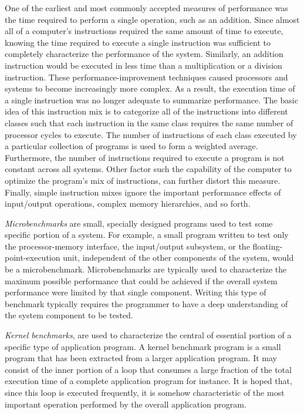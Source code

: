 \documentclass[openany, a4paper]{book}
\theoremstyle{break}
\theoremstyle{example}
\theoremstyle{note}
\theoremstyle{break}
\theoremstyle{exercise}
\begin{document}
One of the earliest and most commonly accepted measures of performance was
the time required to perform a single operation, such as an addition. Since
almost all of a computer's instructions required the same amount of time to
execute, knowing the time required to execute a single instruction was
sufficient to completely characterize the performance of the
system. Similarly, an addition instruction would be executed in less time
than a multiplication or a division instruction. These
performance-improvement techniques caused processors and systems to become
increasingly more complex. As a result, the execution time of a single
instruction was no longer adequate to summarize performance. The basic idea
of this instruction mix is to categorize all of the instructions into
different classes such that each instruction in the same class requires the
same number of processor cycles to execute. The number of instructions of
each class executed by a particular collection of programs is used to form a
weighted average. Furthermore, the number of instructions required to
execute a program is not constant across all systems. Other factor such the
capability of the computer to optimize the program's mix of instructions,
can further distort this measure. Finally, simple instruction mixes ignore
the important performance effects of input/output operations, complex memory
hierarchies, and so forth.

\emph{Microbenchmarks} are small, specially designed programs used to test some
specific portion of a system. For example, a small program written to test
only the processor-memory interface, the input/output subsystem, or the
floating-point-execution unit, independent of the other components of the
system, would be a microbenchmark. Microbenchmarks are typically used to
characterize the maximum possible performance that could be achieved if the
overall system performance were limited by that single component.
Writing this type of benchmark typically requires the programmer to have a
deep understanding of the system component to be tested.

\emph{Kernel benchmarks}, are used to characterize the central of essential portion
of a specific type of application program. A kernel benchmark program is a
small program that has been extracted from a larger application program. It
may consist of the inner portion of a loop that consumes a large fraction of
the total execution time of a complete application program for instance. It
is hoped that, since this loop is executed frequently, it is somehow
characteristic of the most important operation performed by the overall
application program.
\end{document}
